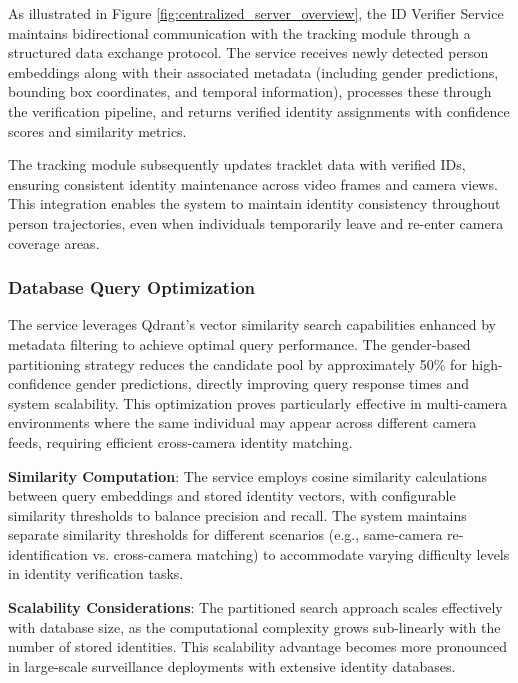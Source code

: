 As illustrated in Figure \ref{fig:centralized_server_overview}, the ID Verifier Service maintains bidirectional communication with the tracking module through a structured data exchange protocol. The service receives newly detected person embeddings along with their associated metadata (including gender predictions, bounding box coordinates, and temporal information), processes these through the verification pipeline, and returns verified identity assignments with confidence scores and similarity metrics.

The tracking module subsequently updates tracklet data with verified IDs, ensuring consistent identity maintenance across video frames and camera views. This integration enables the system to maintain identity consistency throughout person trajectories, even when individuals temporarily leave and re-enter camera coverage areas.

\subsubsection{Database Query Optimization}

The service leverages Qdrant's vector similarity search capabilities enhanced by metadata filtering to achieve optimal query performance. The gender-based partitioning strategy reduces the candidate pool by approximately 50\% for high-confidence gender predictions, directly improving query response times and system scalability. This optimization proves particularly effective in multi-camera \\environments where the same individual may appear across different camera feeds, requiring efficient cross-camera identity matching.

\textbf{Similarity Computation}: The service employs cosine similarity calculations between query embeddings and stored identity vectors, with configurable similarity thresholds to balance precision and recall. The system maintains separate similarity thresholds for different scenarios (e.g., same-camera re-identification vs. cross-camera matching) to accommodate varying difficulty levels in identity verification tasks.

\textbf{Scalability Considerations}: The partitioned search approach scales effectively with database size, as the computational complexity grows sub-linearly with the number of stored identities. This scalability advantage becomes more pronounced in large-scale surveillance deployments with extensive identity databases.

